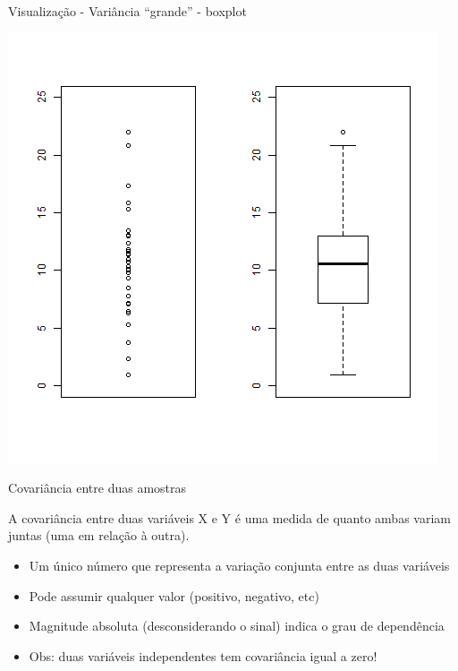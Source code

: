 \documentclass{beamer}
\begin{document}
\begin{frame}{Visualização - Variância ``grande'' - boxplot}
  \begin{center}
    \includegraphics[height=.8\textheight]{Cap17/dot-box-G}
  \end{center}
\end{frame}

\begin{frame}{Covariância entre duas amostras}
  \begin{definition}
    A covariância entre duas variáveis X e Y é uma medida de quanto
    ambas variam juntas (uma em relação à outra).
  \end{definition}
  \begin{itemize}
  \item Um único número que representa a variação conjunta entre as duas variáveis
  \item Pode assumir qualquer valor (positivo, negativo, etc)
  \item Magnitude absoluta (desconsiderando o sinal) indica o grau de dependência
  \item Obs: duas variáveis independentes tem covariância igual a zero!
  \end{itemize}
\end{frame}
\end{document}
